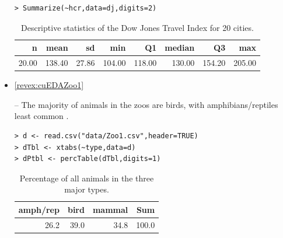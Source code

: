 \documentclass[10pt,openany]{book}\usepackage[]{graphicx}\usepackage[]{color}
\makeatletter
\newenvironment{kframe}{%
 \def\at@end@of@kframe{}%
 \ifinner\ifhmode%
  \def\at@end@of@kframe{\end{minipage}}%
  \begin{minipage}{\columnwidth}%
 \fi\fi%
 \def\FrameCommand##1{\hskip\@totalleftmargin \hskip-\fboxsep
 \colorbox{shadecolor}{##1}\hskip-\fboxsep
     \hskip-\linewidth \hskip-\@totalleftmargin \hskip\columnwidth}%
 \MakeFramed {\advance\hsize-\width
   \@totalleftmargin\z@ \linewidth\hsize
   \@setminipage}}%
 {\par\unskip\endMakeFramed%
 \at@end@of@kframe}
\newenvironment{knitrout}{}{} %
\makeatother
\begin{document}
\begin{itemize}
\begin{knitrout}
\end{knitrout}
\begin{knitrout}
\color{fgcolor}\begin{kframe}
\begin{verbatim}
> Summarize(~hcr,data=dj,digits=2)
\end{verbatim}
\end{kframe}
\end{knitrout}
\begin{table}[ht]
\centering
\caption{Descriptive statistics of the Dow Jones Travel Index for 20 cities.} 
\label{tab:DJSum}
\begin{tabular}{rrrrrrrr}
  \hline
n & mean & sd & min & Q1 & median & Q3 & max \\ 
  \hline
20.00 & 138.40 & 27.86 & 104.00 & 118.00 & 130.00 & 154.20 & 205.00 \\ 
   \hline
\end{tabular}
\end{table}



  \item \hypertarget{ans:cuEDAZoo1}{\ref{revex:cuEDAZoo1}} -- The majority of animals in the zoos are birds, with amphibians/reptiles least common .
\begin{knitrout}
\color{fgcolor}\begin{kframe}
\begin{verbatim}
> d <- read.csv("data/Zoo1.csv",header=TRUE)
> dTbl <- xtabs(~type,data=d)
> dPtbl <- percTable(dTbl,digits=1)
\end{verbatim}
\end{kframe}
\end{knitrout}
\begin{table}[ht]
\centering
\caption{Percentage of all animals in the three major types.} 
\label{tab:Zoo1}
\begin{tabular}{rrrr}
  \hline
amph/rep & bird & mammal & Sum \\ 
  \hline
26.2 & 39.0 & 34.8 & 100.0 \\ 
   \hline
\end{tabular}
\end{table}




\end{itemize}
\end{document}
